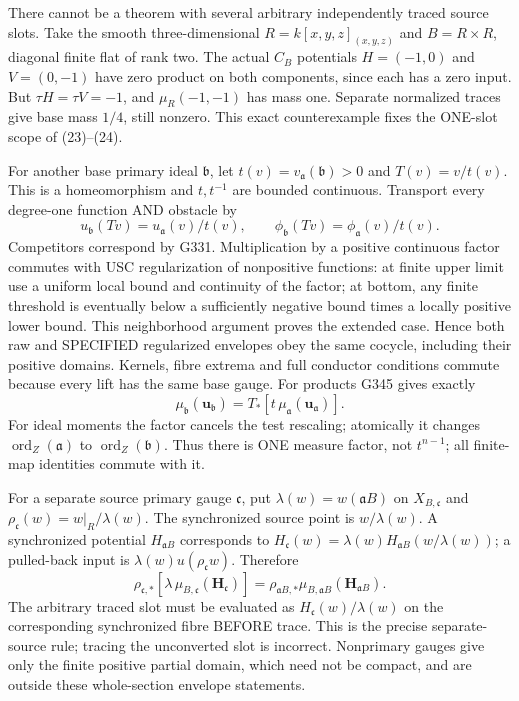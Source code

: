 \documentclass[11pt]{article}
\begin{document}
There cannot be a theorem with several arbitrary independently traced source slots. Take the smooth three-dimensional $R=k[x,y,z]_{(x,y,z)}$ and $B=R\times R$, diagonal finite flat of rank two. The actual $C_B$ potentials $H=(-1,0)$ and $V=(0,-1)$ have zero product on both components, since each has a zero input. But $\tau H=\tau V=-1$, and $\mu_R(-1,-1)$ has mass one. Separate normalized traces give base mass $1/4$, still nonzero. This exact counterexample fixes the ONE-slot scope of (23)--(24).

For another base primary ideal $\mathfrak b$, let $t(v)=v_{\mathfrak a}(\mathfrak b)>0$ and $T(v)=v/t(v)$. This is a homeomorphism and $t,t^{-1}$ are bounded continuous. Transport every degree-one function AND obstacle by
\[
u_{\mathfrak b}(Tv)=u_{\mathfrak a}(v)/t(v),\qquad
\phi_{\mathfrak b}(Tv)=\phi_{\mathfrak a}(v)/t(v).
\]
Competitors correspond by G331. Multiplication by a positive continuous factor commutes with USC regularization of nonpositive functions: at finite upper limit use a uniform local bound and continuity of the factor; at bottom, any finite threshold is eventually below a sufficiently negative bound times a locally positive lower bound. This neighborhood argument proves the extended case. Hence both raw and SPECIFIED regularized envelopes obey the same cocycle, including their positive domains. Kernels, fibre extrema and full conductor conditions commute because every lift has the same base gauge. For products G345 gives exactly
\[
\mu_{\mathfrak b}(\boldsymbol u_{\mathfrak b})
=T_*[t\,\mu_{\mathfrak a}(\boldsymbol u_{\mathfrak a})]. \tag{25}
\]
For ideal moments the factor cancels the test rescaling; atomically it changes $\operatorname{ord}_Z(\mathfrak a)$ to $\operatorname{ord}_Z(\mathfrak b)$. Thus there is ONE measure factor, not $t^{n-1}$; all finite-map identities commute with it.

For a separate source primary gauge $\mathfrak c$, put $\lambda(w)=w(\mathfrak aB)$ on $X_{B,\mathfrak c}$ and $\rho_{\mathfrak c}(w)=w|_R/\lambda(w)$. The synchronized source point is $w/\lambda(w)$. A synchronized potential $H_{\mathfrak aB}$ corresponds to
$H_{\mathfrak c}(w)=\lambda(w)H_{\mathfrak aB}(w/\lambda(w))$;
a pulled-back input is $\lambda(w)u(\rho_{\mathfrak c}w)$. Therefore
\[
\rho_{\mathfrak c,*}[\lambda\,\mu_{B,\mathfrak c}(\boldsymbol H_{\mathfrak c})]
=\rho_{\mathfrak aB,*}\mu_{B,\mathfrak aB}(\boldsymbol H_{\mathfrak aB}). \tag{26}
\]
The arbitrary traced slot must be evaluated as $H_{\mathfrak c}(w)/\lambda(w)$ on the corresponding synchronized fibre BEFORE trace. This is the precise separate-source rule; tracing the unconverted slot is incorrect. Nonprimary gauges give only the finite positive partial domain, which need not be compact, and are outside these whole-section envelope statements.
\end{document}
